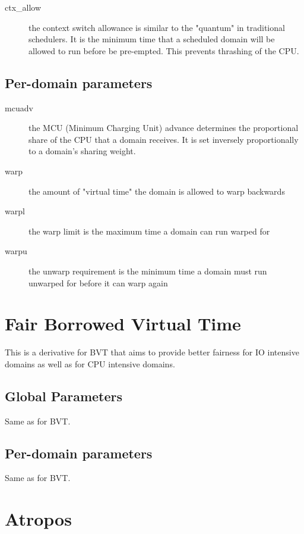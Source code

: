 \documentclass[11pt,twoside,final,openright]{xenstyle}
\begin{document}
{\begin{description}
\item[ctx\_allow]
  the context switch allowance is similar to the "quantum"
  in traditional schedulers.  It is the minimum time that
  a scheduled domain will be allowed to run before be
  pre-empted.  This prevents thrashing of the CPU.
\end{description}

\subsection{Per-domain parameters}

\begin{description}
\item[mcuadv]
  the MCU (Minimum Charging Unit) advance determines the
  proportional share of the CPU that a domain receives.  It
  is set inversely proportionally to a domain's sharing weight.
\item[warp]
  the amount of "virtual time" the domain is allowed to warp
  backwards
\item[warpl]
  the warp limit is the maximum time a domain can run warped for
\item[warpu]
  the unwarp requirement is the minimum time a domain must
  run unwarped for before it can warp again
\end{description}

\section{Fair Borrowed Virtual Time}

This is a derivative for BVT that aims to provide better fairness for
IO intensive domains as well as for CPU intensive domains.

\subsection{Global Parameters}

Same as for BVT.

\subsection{Per-domain parameters}

Same as for BVT.

\section{Atropos}

}
\end{document}
